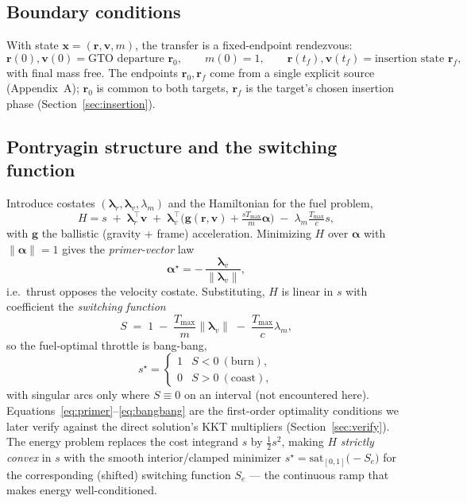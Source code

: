 \documentclass[11pt]{article}
\newcommand{\rv}{\mathbf{r}}
\newcommand{\vv}{\mathbf{v}}
\newcommand{\uv}{\boldsymbol{\alpha}}
\newcommand{\Tmax}{T_{\max}}
\begin{document}
\subsection{Boundary conditions}
With state $\mathbf{x}=(\rv,\vv,m)$, the transfer is a fixed-endpoint rendezvous:
\begin{equation}
  \rv(0),\vv(0) = \text{GTO departure } \rv_0,\qquad m(0)=1,\qquad
  \rv(t_f),\vv(t_f) = \text{insertion state } \rv_f,
\end{equation}
with final mass free. The endpoints $\rv_0,\rv_f$ come from a single explicit
source (Appendix~A); $\rv_0$ is common to both targets,
$\rv_f$ is the target's chosen insertion phase (Section~\ref{sec:insertion}).

\subsection{Pontryagin structure and the switching function}\label{sec:pmp}
Introduce costates $(\boldsymbol\lambda_r,\boldsymbol\lambda_v,\lambda_m)$ and
the Hamiltonian for the fuel problem,
\begin{equation}
  H = s\;+\;\boldsymbol\lambda_r^\top\vv
    \;+\;\boldsymbol\lambda_v^\top\!\Big(\mathbf{g}(\rv,\vv)+\tfrac{s\Tmax}{m}\uv\Big)
    \;-\;\lambda_m\tfrac{\Tmax}{c}s ,
\end{equation}
with $\mathbf{g}$ the ballistic (gravity + frame) acceleration. Minimizing $H$
over $\uv$ with $\lVert\uv\rVert=1$ gives the \emph{primer-vector} law
\begin{equation}
  \uv^\star = -\,\frac{\boldsymbol\lambda_v}{\lVert\boldsymbol\lambda_v\rVert},
  \label{eq:primer}
\end{equation}
i.e.\ thrust opposes the velocity costate. Substituting, $H$ is linear in $s$
with coefficient the \emph{switching function}
\begin{equation}
  S \;=\; 1 \;-\; \frac{\Tmax}{m}\lVert\boldsymbol\lambda_v\rVert
        \;-\; \frac{\Tmax}{c}\lambda_m ,
  \label{eq:switch}
\end{equation}
so the fuel-optimal throttle is bang-bang,
\begin{equation}
  s^\star = \begin{cases} 1 & S<0 \ (\text{burn}),\\[2pt]
                          0 & S>0 \ (\text{coast}),\end{cases}
  \label{eq:bangbang}
\end{equation}
with singular arcs only where $S\equiv0$ on an interval (not encountered here).
Equations~\eqref{eq:primer}--\eqref{eq:bangbang} are the first-order optimality
conditions we later verify against the direct solution's KKT multipliers
(Section~\ref{sec:verify}). The energy problem replaces the cost integrand
$s$ by $\tfrac12 s^2$, making $H$ \emph{strictly convex} in $s$ with the smooth
interior/clamped minimizer $s^\star=\mathrm{sat}_{[0,1]}\!\big(-S_e\big)$ for the
corresponding (shifted) switching function $S_e$ --- the continuous ramp that
makes energy well-conditioned.
\end{document}
